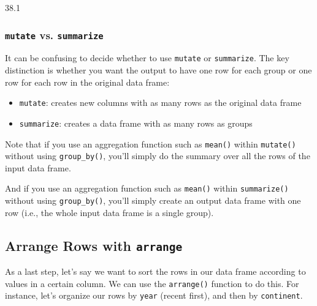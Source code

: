 \documentclass[]{book}
\newenvironment{Shaded}{\begin{snugshade}}{\end{snugshade}}
\newcommand{\KeywordTok}[1]{\textcolor[rgb]{0.13,0.29,0.53}{\textbf{#1}}}
\newcommand{\DataTypeTok}[1]{\textcolor[rgb]{0.13,0.29,0.53}{#1}}
\newcommand{\StringTok}[1]{\textcolor[rgb]{0.31,0.60,0.02}{#1}}
\newcommand{\OperatorTok}[1]{\textcolor[rgb]{0.81,0.36,0.00}{\textbf{#1}}}
\newcommand{\NormalTok}[1]{#1}
\providecommand{\tightlist}{%
  \setlength{\itemsep}{0pt}\setlength{\parskip}{0pt}}
\begin{document}
38.1

\subsubsection*{\texorpdfstring{\texttt{mutate} vs.
\texttt{summarize}}{mutate vs. summarize}}\label{mutate-vs.-summarize}

It can be confusing to decide whether to use \texttt{mutate} or
\texttt{summarize}. The key distinction is whether you want the output
to have one row for each group or one row for each row in the original
data frame:

\begin{itemize}
\tightlist
\item
  \texttt{mutate}: creates new columns with as many rows as the original
  data frame
\item
  \texttt{summarize}: creates a data frame with as many rows as groups
\end{itemize}

Note that if you use an aggregation function such as \texttt{mean()}
within \texttt{mutate()} without using \texttt{group\_by()}, you'll
simply do the summary over all the rows of the input data frame.

And if you use an aggregation function such as \texttt{mean()} within
\texttt{summarize()} without using \texttt{group\_by()}, you'll simply
create an output data frame with one row (i.e., the whole input data
frame is a single group).

\subsection{\texorpdfstring{Arrange Rows with
\texttt{arrange}}{Arrange Rows with arrange}}\label{arrange-rows-with-arrange}

As a last step, let's say we want to sort the rows in our data frame
according to values in a certain column. We can use the
\texttt{arrange()} function to do this. For instance, let's organize our
rows by \texttt{year} (recent first), and then by \texttt{continent}.

\begin{Shaded}
\end{Shaded}
\end{document}
